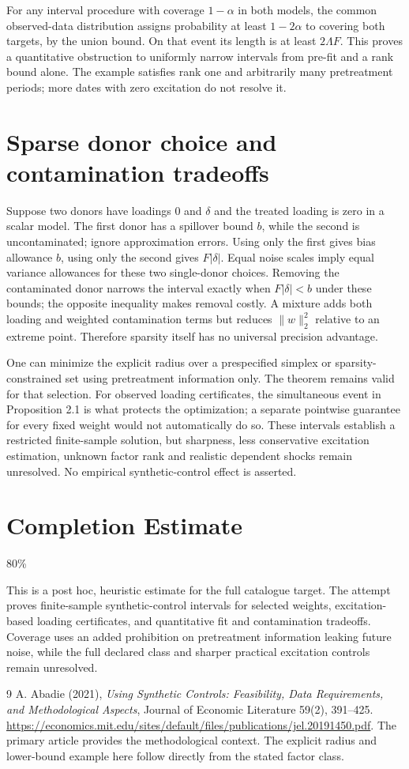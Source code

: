 \documentclass[11pt,a4paper]{article}
\begin{document}
For any interval procedure with coverage $1-\alpha$ in both models, the common observed-data distribution assigns probability at least $1-2\alpha$ to covering both targets, by the union bound. On that event its length is at least $2\Lambda F$. This proves a quantitative obstruction to uniformly narrow intervals from pre-fit and a rank bound alone. The example satisfies rank one and arbitrarily many pretreatment periods; more dates with zero excitation do not resolve it.

\section{Sparse donor choice and contamination tradeoffs}
Suppose two donors have loadings $0$ and $\delta$ and the treated loading is zero in a scalar model. The first donor has a spillover bound $b$, while the second is uncontaminated; ignore approximation errors. Using only the first gives bias allowance $b$, using only the second gives $F|\delta|$. Equal noise scales imply equal variance allowances for these two single-donor choices. Removing the contaminated donor narrows the interval exactly when $F|\delta|<b$ under these bounds; the opposite inequality makes removal costly. A mixture adds both loading and weighted contamination terms but reduces $\|w\|_2^2$ relative to an extreme point. Therefore sparsity itself has no universal precision advantage.

One can minimize the explicit radius over a prespecified simplex or sparsity-constrained set using pretreatment information only. The theorem remains valid for that selection. For observed loading certificates, the simultaneous event in Proposition 2.1 is what protects the optimization; a separate pointwise guarantee for every fixed weight would not automatically do so. These intervals establish a restricted finite-sample solution, but sharpness, less conservative excitation estimation, unknown factor rank and realistic dependent shocks remain unresolved. No empirical synthetic-control effect is asserted.

\section{Completion Estimate}
80\%

This is a post hoc, heuristic estimate for the full catalogue target.
The attempt proves finite-sample synthetic-control intervals for selected weights, excitation-based loading certificates, and quantitative fit and contamination tradeoffs. Coverage uses an added prohibition on pretreatment information leaking future noise, while the full declared class and sharper practical excitation controls remain unresolved.

\begin{thebibliography}{9}
 A. Abadie (2021), \emph{Using Synthetic Controls: Feasibility, Data Requirements, and Methodological Aspects}, Journal of Economic Literature 59(2), 391--425. \url{https://economics.mit.edu/sites/default/files/publications/jel.20191450.pdf}. The primary article provides the methodological context. The explicit radius and lower-bound example here follow directly from the stated factor class.
\end{thebibliography}
\end{document}
